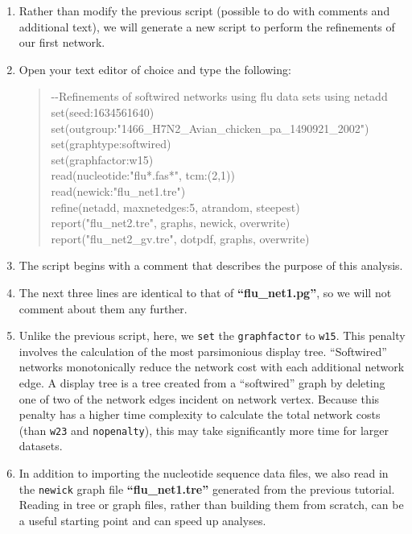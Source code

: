 \documentclass[11pt]{article}
\begin{document}
\begin {enumerate}

\item Rather than modify the previous script (possible to do with comments and 
additional text), we will generate a new script to perform the refinements of our
first network.

\item Open your text editor of choice and type the following:

	\begin{quote}	
	-\/-Refinements of softwired networks using flu data sets using netadd\\
	set(seed:1634561640)\\
	set(outgroup:"1466\_H7N2\_Avian\_chicken\_pa\_1490921\_2002")\\
	set(graphtype:softwired)\\
	set(graphfactor:w15)\\ 
	read(nucleotide:"flu*.fas*", tcm:(2,1))\\
	read(newick:"flu\_net1.tre")\\
	refine(netadd, maxnetedges:5, atrandom, steepest)\\
	report("flu\_net2.tre", graphs, newick, overwrite)\\
	report("flu\_net2\_gv.tre", dotpdf, graphs, overwrite)
	\end{quote}

\item The script begins with a comment that describes the purpose of this 
analysis.

\item The next three lines are identical to that of \textbf{``flu\_net1.pg''}, so we 
will not comment about them any further. 

\item Unlike the previous script, here, we \texttt{set} the \texttt{graphfactor} to 
\texttt{w15}. This penalty involves the calculation of the most parsimonious 
display tree. ``Softwired'' networks monotonically reduce the network cost 
with each additional network edge. A display tree is a tree created from a 
``softwired'' graph by deleting one of two of the network edges incident on 
network vertex. Because this penalty has a higher time complexity to calculate 
the total network costs (than \texttt{w23} and \texttt{nopenalty}), this may take 
significantly more time for larger datasets. 

\item In addition to importing the nucleotide sequence data files, we also
read in the \texttt{newick} graph file \textbf{``flu\_net1.tre''} generated from the 
previous tutorial. Reading in tree or graph files, rather than building them from 
scratch, can be a useful starting point and can speed up analyses.


\end{enumerate}
\end{document}
